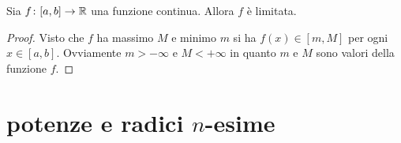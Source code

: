 \begin{corollary}
Sia $f\colon [a,b]\to \mathbb R$ una funzione continua. Allora $f$ è limitata.
\end{corollary}
\begin{proof}
Visto che $f$ ha massimo $M$ e minimo $m$ si ha $f(x)\in [m,M]$ per ogni $x\in[a,b]$.
Ovviamente $m>-\infty$ e $M<+\infty$ in quanto $m$ e $M$ sono valori della funzione $f$.
\end{proof}

\section{potenze e radici $n$-esime}

